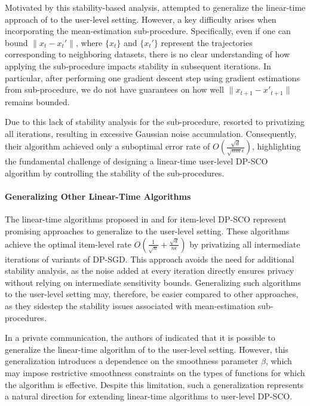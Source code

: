 Motivated by this stability-based analysis, \cite{LLA24} attempted to generalize the linear-time approach of \cite{FKT20} to the user-level setting. However, a key difficulty arises when incorporating the mean-estimation sub-procedure. Specifically, even if one can bound $\|x_t - x_t'\|$, where $\{x_t\}$ and $\{x_t'\}$ represent the trajectories corresponding to neighboring datasets, there is no clear understanding of how applying the sub-procedure impacts stability in subsequent iterations. In particular, after performing one gradient descent step using gradient estimations from sub-procedure, we do not have guarantees on how well $\|x_{t+1} - x'_{t+1}\|$ remains bounded.

Due to this lack of stability analysis for the sub-procedure, \cite{LLA24} resorted to privatizing all iterations, resulting  in excessive Gaussian noise accumulation. Consequently, their algorithm achieved only a suboptimal error rate of $O\left(\frac{\sqrt{d}}{\sqrt{nm} \epsilon}\right)$, highlighting the fundamental challenge of designing a linear-time user-level DP-SCO algorithm by controlling the stability of the sub-procedures.

\paragraph{Generalizing Other Linear-Time Algorithms}

The linear-time algorithms proposed in \cite{zhang2022differentially} and \cite{choquetteoptimal} for item-level DP-SCO represent promising approaches to generalize  to the user-level setting. These algorithms achieve the optimal item-level rate $O\left(\frac{1}{\sqrt{n}} + \frac{\sqrt{d}}{n\epsilon}\right)$ by privatizing all intermediate iterations of variants of DP-SGD. This approach avoids the need for additional stability analysis, as the noise added at every iteration directly ensures privacy without relying on intermediate sensitivity bounds. Generalizing such algorithms to the user-level setting may, therefore, be easier compared to other approaches, as they sidestep the stability issues associated with mean-estimation sub-procedures.

In a private communication, the authors of \cite{LLA24} indicated that it is possible to generalize the linear-time algorithm of \cite{zhang2022differentially} to the user-level setting. 
However, this generalization introduces a dependence on the smoothness parameter $\beta$, which may impose restrictive smoothness constraints on the types of functions for which the algorithm is effective. 
Despite this limitation, such a generalization represents a natural direction for extending linear-time algorithms to user-level DP-SCO.

